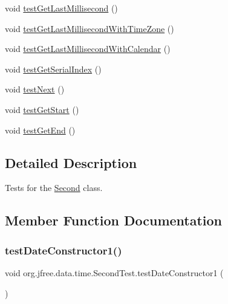 \begin{DoxyCompactItemize}
void \mbox{\hyperlink{classorg_1_1jfree_1_1data_1_1time_1_1_second_test_ab7932dfcb0d973756a07065d88e86efa}{test\+Get\+Last\+Millisecond}} ()
\item 
void \mbox{\hyperlink{classorg_1_1jfree_1_1data_1_1time_1_1_second_test_a276b63a8f227192cb3ec911e9879be3d}{test\+Get\+Last\+Millisecond\+With\+Time\+Zone}} ()
\item 
void \mbox{\hyperlink{classorg_1_1jfree_1_1data_1_1time_1_1_second_test_a858f6059756d9375e95dac4297e22880}{test\+Get\+Last\+Millisecond\+With\+Calendar}} ()
\item 
void \mbox{\hyperlink{classorg_1_1jfree_1_1data_1_1time_1_1_second_test_a7ac6f772c087561883bd577ff1d8f7de}{test\+Get\+Serial\+Index}} ()
\item 
void \mbox{\hyperlink{classorg_1_1jfree_1_1data_1_1time_1_1_second_test_a9e6632c5ae1aedc12dc1a8fb58111e31}{test\+Next}} ()
\item 
void \mbox{\hyperlink{classorg_1_1jfree_1_1data_1_1time_1_1_second_test_a892530a0743f4bdf4e26a057d0b369f9}{test\+Get\+Start}} ()
\item 
void \mbox{\hyperlink{classorg_1_1jfree_1_1data_1_1time_1_1_second_test_a7f1867d4124a1ecf308e35644a6e35e6}{test\+Get\+End}} ()
\end{DoxyCompactItemize}


\subsection{Detailed Description}
Tests for the \mbox{\hyperlink{classorg_1_1jfree_1_1data_1_1time_1_1_second}{Second}} class. 

\subsection{Member Function Documentation}
\mbox{\label{classorg_1_1jfree_1_1data_1_1time_1_1_second_test_a09e0c8226d006fc952613b5492e0744b}} 
\subsubsection{\texorpdfstring{test\+Date\+Constructor1()}{testDateConstructor1()}}
{\footnotesize\ttfamily void org.\+jfree.\+data.\+time.\+Second\+Test.\+test\+Date\+Constructor1 (\begin{DoxyParamCaption}{ }\end{DoxyParamCaption})}

